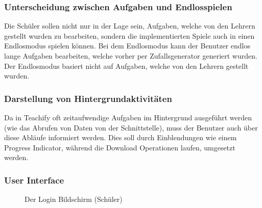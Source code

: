 \subsubsection{Unterscheidung zwischen Aufgaben und Endlosspielen}
Die Schüler sollen nicht nur in der Lage sein, Aufgaben, welche von den Lehrern gestellt wurden zu bearbeiten, sondern die implementierten Spiele auch in einen Endlosmodus spielen können. Bei dem Endlosmodus kann der Benutzer endlos lange Aufgaben bearbeiten, welche vorher per Zufallsgenerator generiert wurden. Der Endlosmodus basiert nicht auf Aufgaben, welche von den Lehrern gestellt wurden.

\subsubsection{Darstellung von Hintergrundaktivitäten}
Da in Teachify oft zeitaufwendige Aufgaben im Hintergrund ausgeführt werden (wie das Abrufen von Daten von der Schnittstelle), muss der Benutzer auch über diese Abläufe informiert werden. Dies soll durch Einblendungen wie einem Progress Indicator, während die Download Operationen laufen, umgesetzt werden.


\subsubsection{User Interface}
\begin{figure}[h]
	\centering
	\caption{Der Login Bildschirm (Schüler)}
	\label{Der Login Bildschirm}
\end{figure}

